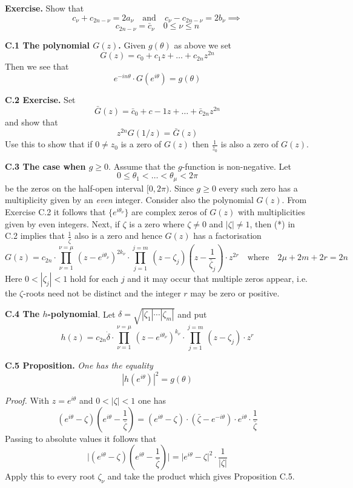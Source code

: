 \documentclass{amsart}
\begin{document}
{\noindent
{\bf Exercise.}
Show that
\[
c_\nu+c_{2n-\nu}=2a_\nu\quad \text{and}\quad c_{\nu}-c_{2n-\nu}=2 b_\nu\implies
\]
\[
c_{2n-\nu}=\bar c_\nu\quad 0\leq\nu\leq n
\]


\noindent
{\bf C.1 The polynomial $G(z)$.}
Given $g(\theta)$ as above we set
\[ 
G(z)= c_0+c_1z+\ldots+c_{2n}z^{2n}
\]
Then we see that
\[ 
e^{-in\theta}\cdot G(e^{i\theta})= g(\theta)
\]


\noindent
{\bf C.2 Exercise.}  Set
\[ 
\bar G(z)= \bar c_0+c-1z+\ldots+\bar c_{2n}z^{2n}
\]
and show that
\[ z^{2n}G(1/z)= \bar G(z)\tag{*}
\]
Use this to show that if
$0\neq z_0$ is a zero of $G(z)$ then
$\frac{1}{\bar z_0}$ is also a zero of $G(z)$.
\medskip

\noindent
{\bf{C.3 The case when $g\geq 0$}}. Assume that the $g$-function is non-negative.
Let
\[ 
0\leq \theta_1<\ldots<\theta_\mu<2\pi
\]
be the zeros on the half-open interval $[0,2\pi)$.
Since $g\geq 0$ every such zero has a multiplicity given by
an \emph{even} integer.
Consider also the polynomial $G(z)$. From Exercise C.2    it follows that
$\{e^{i\theta_\nu}\}$ are complex zeros of $G(z)$
with multiplicities given by even integers.
Next, if $\zeta$ is a zero where
$\zeta\neq 0$ and $|\zeta|\neq 1$, then (*) in C.2
implies that
$\frac{1}{\bar\zeta}$ also is  a zero and hence
$G(z)$ has a factorisation
\[
G(z)= c_{2n}
\cdot \prod_{\nu=1}^{\nu=\mu}\,
(z-e^{i\theta_\nu})^{2k_\nu}\cdot \prod_{j=1}^{j=m}\,
(z-\zeta_j)(z-\frac{1}{\bar\zeta_j})\cdot z^{2r}
\quad\text{where}\quad 2\mu+2m+2r=2n
\]
Here $0<|\zeta_j|<1$ hold for each $j$ and it may occur that
multiple zeros appear,  i.e. the
$\zeta$-roots need not be distinct and  the integer $r$ may be zero
or positive.
\medskip

\noindent
{\bf {C.4 The $h$-polynomial}}. Let
$\delta=\sqrt{|\zeta_1|\cdots|\zeta_m|}$ and put
\[
h(z)=c_{2n}\dot \delta\cdot \prod_{\nu=1}^{\nu=\mu}\,
(z-e^{i\theta_\nu})^{k_\nu}\cdot \prod_{j=1}^{j=m}\,
(z-\zeta_j)\cdot z^{r}
\]


\noindent
{\bf C.5 Proposition.} \emph{One has the equality}
\[
|h(e^{i\theta})|^2=g(\theta)
\]


\noindent
\emph{Proof.}
With $z=e^{i\theta}$ and $0<|\zeta|<1$ one has
\[
(e^{i\theta}-\zeta)
(e^{i\theta}-\frac{1}{\bar \zeta})=
(e^{i\theta}-\zeta)\cdot (\bar\zeta -e^{-i\theta})\cdot
e^{i\theta}\cdot\frac{1}{\bar \zeta}
\]
Passing to absolute values it follows that
\[
\bigl|(e^{i\theta}-\zeta)
(e^{i\theta}-\frac{1}{\bar \zeta})\bigr|=
\bigl|e^{i\theta}-\zeta\bigr|^2\cdot 
\frac{1}{|\zeta|}
\]
Apply this to every root $\zeta_\nu$ and take the 
product which
gives 
Proposition C.5.
\bigskip

}
\end{document}
